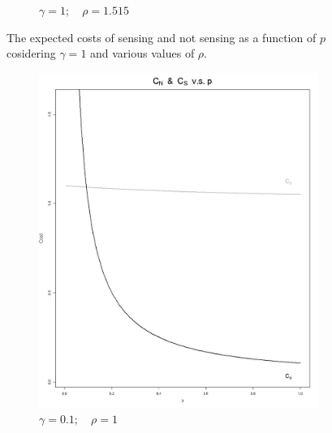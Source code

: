 \documentclass[11pt]{article}
\numberwithin{equation}{section}
\begin{document}
\begin{figure}[h!]
\begin{subfigure}[b]{0.49\textwidth}
		\caption{$\gamma=1;\quad\rho=1.515$}
		\label{cost_vs_p_1_1_515}
	\end{subfigure}
	\caption{The expected costs of sensing and not sensing as a function of $p$ cosidering $\gamma=1$ and various values of $\rho$.}\label{CostVsP gamma=1}
\end{figure}

\newpage
\begin{figure}[h!]
	\centering
	\begin{subfigure}[b]{0.49\textwidth}
	\includegraphics[width=\textwidth]{plots/cost_vs_p_0_1_1.png}
		\caption{$\gamma=0.1;\quad\rho=1$}
		\label{cost_vs_p_0_1_1}
	\end{subfigure}
	\begin{subfigure}[b]{0.49\textwidth}

\end{subfigure}
\end{figure}
\end{document}
